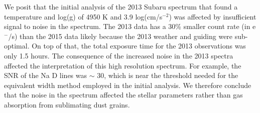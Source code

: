 \documentclass[preprint,trackchanges]{aastex61}
\begin{document}
We posit that the initial analysis of the 2013 Subaru spectrum \citep{kawahara2013starspots} that found a temperature and log(g) of 4950 K and 3.9 log(cm/s$^{-2}$) was affected by insufficient signal to noise in the spectrum.
The 2013 data has a 30\% smaller count rate (in e$^-$/s) than the 2015 data likely because the 2013 weather and guiding were sub-optimal.
On top of that, the total exposure time for the 2013 observations was only 1.5 hours.
The consequence of the increased noise in the 2013 spectra affected the interpretation of this high resolution spectrum.
For example, the SNR of the Na D lines was $\sim$ 30, which is near the threshold needed for the \citet{takeda2005specFGKdwarfs} equivalent width method employed in the initial analysis.
We therefore conclude that the noise in the spectrum affected the stellar parameters rather than gas absorption from sublimating dust grains.
\end{document}
